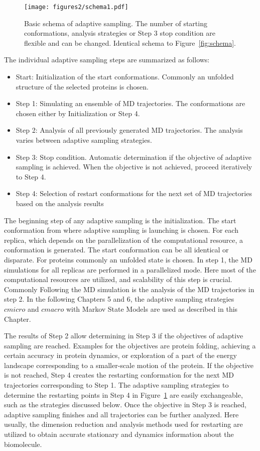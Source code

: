 \begin{figure}[h]
  \centering
  \texttt{[image: figures2/schema1.pdf]}
  \caption{Basic schema of adaptive sampling. The
  number of starting conformations, analysis strategies or Step 3 stop condition are flexible and can be changed. Identical schema to Figure~\ref{fig:schema}.}
  \label{fig:schema2}
\end{figure}

The individual adaptive sampling steps are summarized as follows:
\begin{itemize}
\item Start: Initialization of the start conformations.  Commonly an unfolded structure of the selected proteins is chosen.
\item Step 1: Simulating an ensemble of MD trajectories. The conformations are chosen either by Initialization or Step 4. 
\item Step 2: Analysis of all previously generated MD trajectories. The analysis varies between adaptive sampling strategies.
\item Step 3: Stop condition. Automatic determination if the objective of adaptive sampling is achieved. When the objective is not achieved, proceed iteratively to Step 4. 
\item Step 4: Selection of restart conformations for the next set of MD trajectories based on the analysis results 
\end{itemize}

The beginning step of any adaptive sampling is the initialization. The start conformation from where adaptive sampling is launching is chosen. For each replica, which depends on the parallelization of the computational resource, a conformation is generated. The start conformation can be all identical or disparate. For proteins commonly an unfolded state is chosen.
In step 1, the MD simulations for all replicas are performed in a parallelized mode. Here most of the computational resources are utilized, and scalability of this step is crucial. Commonly  
Following the MD simulation is the analysis of the MD trajectories in step 2. In the following Chapters 5 and 6, the adaptive sampling strategies $cmicro$ and $cmacro$ with Markov State Models \cite{prinz2011markov} are used as described in this Chapter. 

The results of Step 2 allow determining in Step 3 if the objectives of adaptive sampling are reached. Examples for the objectives are protein folding, achieving a certain accuracy in protein dynamics, or exploration of a part of the energy landscape corresponding to a smaller-scale motion of the protein. If the objective is not reached, Step 4 creates the restarting conformation for the next MD trajectories corresponding to Step 1. The adaptive sampling strategies to determine the restarting points in Step 4 in Figure~\ref{fig:schema2} are easily exchangeable, such as the strategies discussed below. Once the objective in Step 3 is reached, adaptive sampling finishes and all trajectories can be further analyzed. Here usually, the dimension reduction and analysis methods used for restarting are utilized to obtain accurate stationary and dynamics information about the biomolecule.


